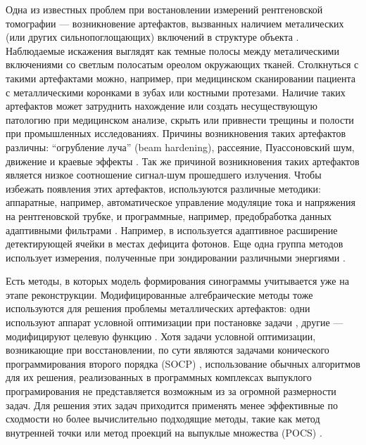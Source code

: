 Одна из известных проблем при востановлении измерений рентгеновской томографии --- возникновение артефактов, вызванных наличием металических (или других сильнопоглощающих) включений в структуре объекта \cite{barrett2004artifacts, boas2012ct, nasirudin2015reduction, park2015computed}.
Наблюдаемые искажения выглядят как темные полосы между металическими включениями со светлым полосатым ореолом окружающих тканей.
Столкнуться с такими артефактами можно, например, при медицинском сканировании пациента с металлическими коронками в зубах или костными протезами.
Наличие таких артефактов может затруднить нахождение или создать несуществующую патологию при медицинском анализе, скрыть или привнести трещины и полости при промышленных исследованиях.
Причины возникновения таких артефактов различны: ``огрубление луча'' (beam hardening), рассеяние, Пуассоновский шум, движение и краевые эффекты \cite{boas2012ct}.
Так же причиной возникновения таких артефактов является низкое соотношение сигнал-шум прошедшего излучения.
Чтобы избежать появления этих артефактов, используются различные методики: аппаратные, например, автоматическое управление модуляцие тока и напряжения на рентгеновской трубке, и программные, например, предобработка данных адаптивными фильтрами \cite{zhang2007reducing}.
Например, в \cite{boas2012ct} используется адаптивное расширение детектирующей ячейки в местах дефицита фотонов.
Еще одна группа методов использует измерения, полученные при зондировании различными энергиями \cite{bamberg2011metal, kuchenbecker2015dual}.

Есть методы, в которых модель формирования синограммы учитывается уже на этапе реконструкции.
Модифицированные алгебраические методы тоже используются для решения проблемы металлических артефактов: одни используют аппарат условной оптимизации при постановке задачи \cite{zhang2011metal, sidky2008image}, другие --- модифицируют целевую функцию \cite{meyer2010normalized, kotsenas2015ct}.
Хотя задачи условной оптимизации, возникающие при восстановлении, по сути являются задачами конического программирования второго порядка (SOCP) \cite{boyd2004convex, nesterov2009primal}, использование обычных алгоритмов для их решения, реализованных в программных комплексах выпуклого програмирования \cite{andersen2013cvxopt, mosek2010mosek} не представляется возможным из за огромной размерности задач.
Для решения этих задач приходится применять менее эффективные по сходмости но более вычислительно подходящие методы, такие как метод внутренней точки \cite{kim2007interior} или метод проекций на выпуклые множества (POCS) \cite{sidky2008image}.

